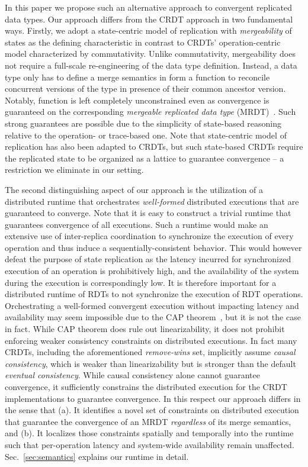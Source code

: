 In this paper we propose such an alternative approach to convergent
replicated data types.  
Our approach differs from the CRDT approach in
two fundamental ways. Firstly, we adopt a state-centric model of
replication with \emph{mergeability} of states as the defining
characteristic in contrast to CRDTs' operation-centric model
characterized by commutativity. Unlike commutativity, mergeability
does not require a full-scale re-engineering of the data type
definition. Instead, a data type only has to define a merge semantics
in form a  function to reconcile concurrent versions of the
type in presence of their common ancestor version. Notably, 
function is left completely unconstrained even as convergence is
guaranteed on the corresponding \emph{mergeable replicated data type}
(MRDT)~\cite{mrdt}. Such strong guarantees are possible due to the
simplicity of state-based reasoning relative to the operation- or
trace-based one. Note that state-centric model of replication has also
been adapted to CRDTs, but such state-based CRDTs require the
replicated state to be organized as a lattice to guarantee convergence
-- a restriction we eliminate in our setting. 

The second distinguishing aspect of our approach is the utilization of a
distributed runtime that orchestrates \emph{well-formed} distributed
executions that are guaranteed to converge. Note that it is easy to
construct a trivial runtime that guarantees convergence of all executions.
Such a runtime would make an extensive use of inter-replica coordination to
synchronize the execution of every operation and thus induce a
sequentially-consistent behavior. This would however defeat the purpose of
state replication as the latency incurred for synchronized execution of an
operation is prohibitively high, and the availability of the system during
the execution is correspondingly low. It is therefore important for a
distributed runtime of RDTs to not synchronize the execution of RDT
operations. Orchestrating a well-formed convergent execution without
impacting latency and availability may seem impossible due to the CAP
theorem~\cite{cap}, but it is not the case in fact. While CAP theorem does
rule out linearizability, it does not prohibit enforcing weaker consistency
constraints on distributed executions. In fact many CRDTs, including the
aforementioned \emph{remove-wins} set, implicitly assume \emph{causal
consistency}, which is weaker than linearizability but is stronger than the
default \emph{eventual consistency}. While causal consistency alone cannot
guarantee convergence, it sufficiently constrains the distributed execution
for the CRDT implementations to guarantee convergence. In this respect our
approach differs in the sense that (a). It identifies a novel set of
constraints on distributed execution that guarantee the convergence of an
MRDT \emph{regardless} of its merge semantics, and (b). It localizes those
constraints spatially and temporally into the runtime such that
per-operation latency and system-wide availability remain unaffected.
Sec.~\ref{sec:semantics} explains our runtime in detail. 

